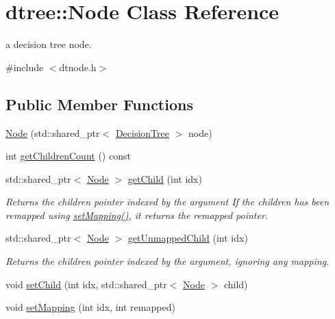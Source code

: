 \hypertarget{classdtree_1_1_node}{}\section{dtree\+::Node Class Reference}
\label{classdtree_1_1_node}


a decision tree node.  




{\ttfamily \#include $<$dtnode.\+h$>$}

\subsection*{Public Member Functions}
\begin{DoxyCompactItemize}
\item 
\mbox{\hyperlink{classdtree_1_1_node_ad74d818e410568df7e3f0c6574f11b07}{Node}} (std\+::shared\+\_\+ptr$<$ \mbox{\hyperlink{classdtree_1_1_decision_tree}{Decision\+Tree}} $>$ node)
\item 
int \mbox{\hyperlink{classdtree_1_1_node_a176942c36ed1c832f8f4f4d8c671548e}{get\+Children\+Count}} () const
\item 
std\+::shared\+\_\+ptr$<$ \mbox{\hyperlink{classdtree_1_1_node}{Node}} $>$ \mbox{\hyperlink{classdtree_1_1_node_aede43a583b04a97ecd840e078a9ad0bd}{get\+Child}} (int idx)
\begin{DoxyCompactList}\small\item\em Returns the children pointer indexed by the argument If the children has been remapped using \mbox{\hyperlink{classdtree_1_1_node_a8dd25ca52f48a197d24662b366166fc6}{set\+Mapping()}}, it returns the remapped pointer. \end{DoxyCompactList}\item 
std\+::shared\+\_\+ptr$<$ \mbox{\hyperlink{classdtree_1_1_node}{Node}} $>$ \mbox{\hyperlink{classdtree_1_1_node_a903fc95c0c0246f7d359dc50e2550e12}{get\+Unmapped\+Child}} (int idx)
\begin{DoxyCompactList}\small\item\em Returns the children pointer indexed by the argument, ignoring any mapping. \end{DoxyCompactList}\item 
void \mbox{\hyperlink{classdtree_1_1_node_ab7c733478351a59ef46aad36b34bef41}{set\+Child}} (int idx, std\+::shared\+\_\+ptr$<$ \mbox{\hyperlink{classdtree_1_1_node}{Node}} $>$ child)
\item 
void \mbox{\hyperlink{classdtree_1_1_node_a8dd25ca52f48a197d24662b366166fc6}{set\+Mapping}} (int idx, int remapped)

\end{DoxyCompactItemize}
